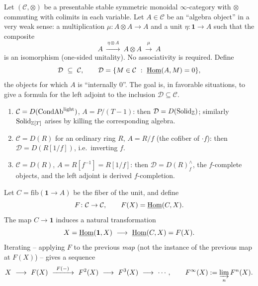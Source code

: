 \begin{definition}
\label{def:13:killing}
Let $(\mathcal C,\otimes)$ be a presentable stable symmetric monoidal
$\infty$-category with $\otimes$ commuting with colimits in each variable. Let
$A\in\mathcal C$ be an ``algebra object'' in a very weak sense: a multiplication
$\mu\colon A\otimes A\to A$ and a unit $\eta\colon \mathbf 1\to A$ such that the
composite
\begin{equation}
\label{eq:13:weak-unital}
A\ \xrightarrow{\ \eta\otimes A\ }\ A\otimes A\ \xrightarrow{\ \mu\ }\ A
\end{equation}
is an isomorphism (one-sided unitality). No associativity is required. Define
\begin{equation*}
\mathcal D\ \subseteq\ \mathcal C,\qquad \mathcal D=\{M\in\mathcal C\ :\ \underline{\operatorname{Hom}}(A,M)=0\},
\end{equation*}
the objects for which $A$ is ``internally $0$''. The goal is, in favorable
situations, to give a formula for the left adjoint to the inclusion
$\mathcal D\subseteq\mathcal C$.
\end{definition}

\begin{example}
\label{ex:13:killing-examples}
\begin{enumerate}
\item $\mathcal C=D(\mathrm{CondAb}^{\mathrm{light}})$, $A=P/(T-1)$: then $\mathcal D=D(\mathrm{Solid}_{\mathbb Z})$;
similarly $\mathrm{Solid}_{\mathbb Z[T]}$ arises by killing the corresponding algebra.
\item $\mathcal C=D(R)$ for an ordinary ring $R$, $A=R/f$ (the cofiber of
$\cdot f$): then $\mathcal D=D(R[1/f])$, i.e.\ inverting $f$.
\item $\mathcal C=D(R)$, $A=R[f^{-1}]=R[1/f]$: then $\mathcal D=D(R)^{\wedge}_f$,
the $f$-complete objects, and the left adjoint is derived $f$-completion.
\end{enumerate}
\end{example}

\begin{construction}
\label{constr:13:F}
Let $C=\mathrm{fib}(\mathbf 1\to A)$ be the fiber of the unit, and define
\begin{equation*}
F\colon\mathcal C\to\mathcal C,\qquad F(X)=\underline{\operatorname{Hom}}(C,X).
\end{equation*}
The map $C\to\mathbf 1$ induces a natural transformation
\begin{equation*}
X=\iHom(\mathbf 1,X)\ \longrightarrow\ \iHom(C,X)=F(X).
\end{equation*}
Iterating -- applying $F$ to the previous \emph{map} (not the instance of the
previous map at $F(X)$) -- gives a sequence
\begin{equation}
\label{eq:13:iterate}
X\ \longrightarrow\ F(X)\ \xrightarrow{\ F(-)\ }\ F^2(X)\ \longrightarrow\ F^3(X)\ \longrightarrow\ \cdots,
\qquad
F^\infty(X):=\varinjlim_n F^n(X).
\end{equation}
\end{construction}

